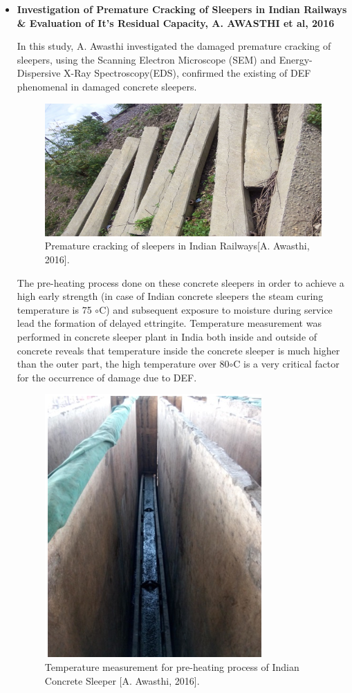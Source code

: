 \begin{itemize}
    \item
    \textbf{Investigation of Premature Cracking of Sleepers in Indian Railways \& Evaluation of It's Residual Capacity, A. AWASTHI et al, 2016}

      In this study, A. Awasthi investigated the damaged premature cracking of sleepers, using the Scanning Electron Microscope (SEM) and Energy-Dispersive X-Ray Spectroscopy(EDS), confirmed the existing of DEF phenomenal in damaged concrete sleepers.

      \begin{figure}[ht!]
          \centering
          \includegraphics[width=.6\linewidth]{Files/Background/Anupam_3.png}
          \caption{Premature cracking of sleepers in Indian Railways[A. Awasthi, 2016].}
          \label{fig:Awasthi_3}
      \end{figure}

      The pre-heating process done on these concrete sleepers in order to achieve a high early strength (in case of Indian concrete sleepers the steam curing temperature is 75 $\circ$C) and subsequent exposure to moisture during service lead the formation of delayed ettringite. Temperature measurement was performed in concrete sleeper plant in India both inside and outside of concrete reveals that temperature inside the concrete sleeper is much higher than the outer part, the high temperature over 80$\circ$C is a very critical factor for the occurrence of damage due to DEF.

      \begin{figure}[ht!]
          \centering
          \includegraphics[width=.4\linewidth]{Files/Background/Anupam_4.png}
          \caption{Temperature measurement for pre-heating process of Indian Concrete Sleeper [A. Awasthi, 2016].}
          \label{fig:Awasthi_4}
      \end{figure}


\end{itemize}
